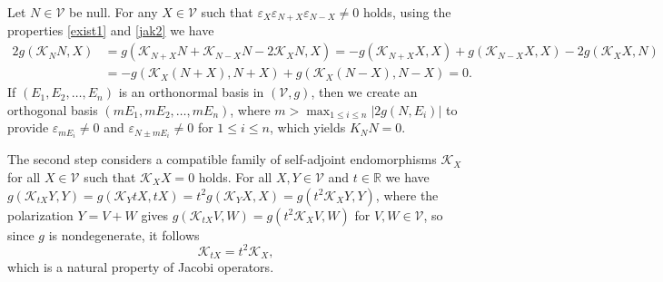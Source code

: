 \documentclass[preprint]{elsarticle}
\newcommand\mc{\mathcal}
\newcommand\mb{\mathbb}
\newcommand\ve{\varepsilon}%
\begin{document}
Let $N\in\mc{V}$ be null. For any $X\in\mc{V}$ such that $\ve_X\ve_{N+X}\ve_{N-X}\neq 0$ holds, 
using the properties \eqref{exist1} and \eqref{jak2} we have
\begin{equation*}
\begin{aligned}
2g(\mc{K}_NN,X)&=g(\mc{K}_{N+X}N+\mc{K}_{N-X}N-2\mc{K}_X N,X)=-g(\mc{K}_{N+X}X,X)+g(\mc{K}_{N-X}X,X)-2g(\mc{K}_X X,N)\\
&=-g(\mc{K}_{X}(N+X),N+X)+g(\mc{K}_{X}(N-X),N-X)=0.
\end{aligned}
\end{equation*}
If $(E_1,E_2,\dots,E_n)$ is an orthonormal basis in $(\mc{V},g)$, then we create an orthogonal basis $(mE_1,mE_2,\dots,mE_n)$,
where $m>\max_{1\leq i\leq n} {|2g(N,E_i)|}$ to provide $\ve_{mE_i}\neq 0$ and $\ve_{N\pm mE_i}\neq 0$ for $1\leq i\leq n$,
which yields $K_NN=0$.

The second step considers a compatible family of self-adjoint endomorphisms $\mc{K}_X$ for all $X\in\mc{V}$ such that $\mc{K}_XX=0$ holds.
For all $X,Y\in\mc{V}$ and $t\in\mb{R}$ we have
$g(\mc{K}_{tX}Y,Y)=g(\mc{K}_{Y}tX,tX)=t^2g(\mc{K}_{Y}X,X)=g(t^2\mc{K}_{X}Y,Y)$,
where the polarization $Y=V+W$ gives $g(\mc{K}_{tX}V,W)=g(t^2\mc{K}_{X}V,W)$ for $V,W\in\mc{V}$, 
so since $g$ is nondegenerate, it follows
\begin{equation}\label{exist2}
\mc{K}_{tX}=t^2\mc{K}_{X},
\end{equation}
which is a natural property of Jacobi operators.
\end{document}
